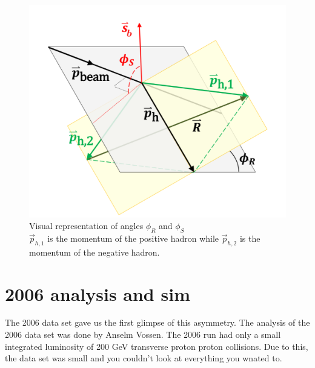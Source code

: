 \documentclass[abstract = on,listof=totoc, bibliography=totoc]{scrreprt}
\newcommand{\phir}{\phi_{R}}
\newcommand{\phis}{\phi_{S}}
\begin{document}
\begin{figure}
\begin{center}
\includegraphics[width = 1\textwidth]{IFF_frame_edit2}
\caption[Angles $\phis$ and $\phir$]{Visual representation of angles $\phi_R$ and $\phi_S$ \\ $\vec{p}_{h,1}$ is the momentum of the positive hadron while  $\vec{p}_{h,2}$ is the momentum of the negative hadron.}
\label{fig:angleDeff}
\end{center}
\end{figure}




\chapter{2006 analysis and sim}

The 2006 data set gave us the first glimpse of this asymmetry. The analysis of the 2006 data set was done by Anselm Vossen. The 2006 run had only a small integrated luminosity of 200 GeV transverse proton proton collisions. Due to this, the data set was small and you couldn't look at everything you wnated to. 
\end{document}
